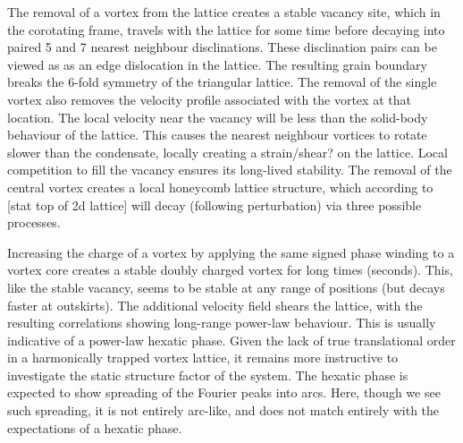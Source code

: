 The removal of a vortex from the lattice creates a stable vacancy site, which in the corotating frame, travels with the lattice for some time
before decaying into paired 5 and 7 nearest neighbour disclinations. These disclination pairs can be viewed as as an edge dislocation in the
lattice. The resulting grain boundary breaks the 6-fold symmetry of the triangular lattice. The removal of the single vortex also removes the
velocity profile associated with the vortex at that location. The local velocity near the vacancy will be less than the solid-body behaviour
of the lattice. This causes the nearest neighbour vortices to rotate slower than the condensate, locally creating a strain/shear? on the
lattice. Local competition to fill the vacancy ensures its long-lived stability. The removal of the central vortex creates a local honeycomb
lattice structure, which according to [stat top of 2d lattice] will decay (following perturbation) via three possible processes.

Increasing the charge of a vortex by applying the same signed phase winding to a vortex core creates a stable doubly charged vortex for long
times (seconds). This, like the stable vacancy, seems to be stable at any range of positions (but decays faster at outskirts). The additional
velocity field shears the lattice, with the resulting correlations showing long-range power-law behaviour. This is usually indicative of a
power-law hexatic phase. Given the lack of true translational order in a harmonically trapped vortex lattice, it remains more instructive to
investigate the static structure factor of the system. The hexatic phase is expected to show spreading of the Fourier peaks into arcs. Here,
though we see such spreading, it is not entirely arc-like, and does not match entirely with the expectations of a hexatic phase.	



